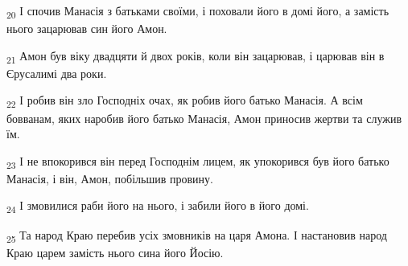 \begin{tcolorbox}
\textsubscript{20} І спочив Манасія з батьками своїми, і поховали його в домі його, а замість нього зацарював син його Амон.
\end{tcolorbox}
\begin{tcolorbox}
\textsubscript{21} Амон був віку двадцяти й двох років, коли він зацарював, і царював він в Єрусалимі два роки.
\end{tcolorbox}
\begin{tcolorbox}
\textsubscript{22} І робив він зло Господніх очах, як робив його батько Манасія. А всім бовванам, яких наробив його батько Манасія, Амон приносив жертви та служив їм.
\end{tcolorbox}
\begin{tcolorbox}
\textsubscript{23} І не впокорився він перед Господнім лицем, як упокорився був його батько Манасія, і він, Амон, побільшив провину.
\end{tcolorbox}
\begin{tcolorbox}
\textsubscript{24} І змовилися раби його на нього, і забили його в його домі.
\end{tcolorbox}
\begin{tcolorbox}
\textsubscript{25} Та народ Краю перебив усіх змовників на царя Амона. І настановив народ Краю царем замість нього сина його Йосію.
\end{tcolorbox}
